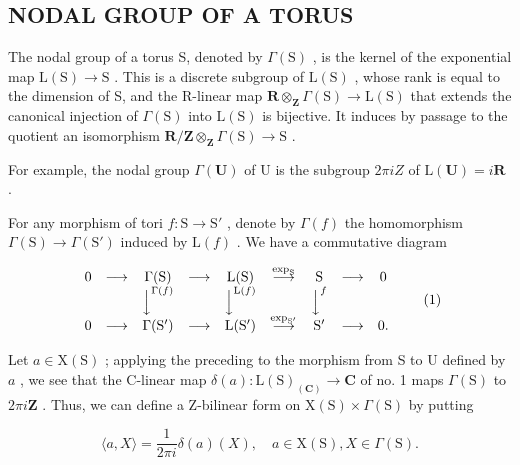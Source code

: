 \subsection{NODAL GROUP OF A TORUS}

The nodal group of a torus S, denoted by \(\Gamma(\mathrm{S})\) , is the kernel of the exponential map \(\mathrm{L}(\mathrm{S}) \to \mathrm{S}\) . This is a discrete subgroup of \(\mathrm{L}(\mathrm{S})\) , whose rank is equal to the dimension of S, and the R-linear map \(\mathbf{R} \otimes_{\mathbf{Z}} \Gamma(\mathrm{S}) \to \mathrm{L}(\mathrm{S})\) that extends the canonical injection of \(\Gamma(\mathrm{S})\) into \(\mathrm{L}(\mathrm{S})\) is bijective. It induces by passage to the quotient an isomorphism \(\mathbf{R}/\mathbf{Z} \otimes_{\mathbf{Z}} \Gamma(\mathrm{S}) \to \mathrm{S}\) .

For example, the nodal group \(\Gamma(\mathbf{U})\) of U is the subgroup \(2\pi iZ\) of \(\mathrm{L}(\mathbf{U}) = i\mathbf{R}\) .

For any morphism of tori \(f: \mathrm{S} \to \mathrm{S}'\) , denote by \(\Gamma(f)\) the homomorphism \(\Gamma(\mathrm{S}) \to \Gamma(\mathrm{S}')\) induced by \(\mathrm{L}(f)\) . We have a commutative diagram

\[
\begin{array}{c c c c c c c c c} 0 & \longrightarrow & \Gamma (\mathrm{S}) & \longrightarrow & \mathrm{L} (\mathrm{S}) & \stackrel {{\exp_ {\mathrm{S}}}} {{\longrightarrow}} & \mathrm{S} & \longrightarrow & 0 \\ & & \Big \downarrow^ {\Gamma (f)} & & \Big \downarrow^ {\mathrm{L} (f)} & & \Big \downarrow^ {f} \\ 0 & \longrightarrow & \Gamma (\mathrm{S} ^ {\prime}) & \longrightarrow & \mathrm{L} (\mathrm{S} ^ {\prime}) & \stackrel {{\exp_ {\mathrm{S} ^ {\prime}}}} {{\longrightarrow}} & \mathrm{S} ^ {\prime} & \longrightarrow & 0. \end{array}\tag{1}
\]

Let \(a \in \mathrm{X}(\mathrm{S})\) ; applying the preceding to the morphism from S to U defined by \(a\) , we see that the C-linear map \(\delta(a) : \mathrm{L}(\mathrm{S})_{(\mathbf{C})} \to \mathbf{C}\) of no. 1 maps \(\Gamma(\mathrm{S})\) to \(2\pi i\mathbf{Z}\) . Thus, we can define a Z-bilinear form on \(\mathrm{X}(\mathrm{S}) \times \Gamma(\mathrm{S})\) by putting

\[
\langle a, X \rangle = \frac {1}{2 \pi i} \delta (a) (X), \quad a \in \mathrm{X(S)}, X \in \Gamma (\mathrm{S}).\tag{2}
\]

